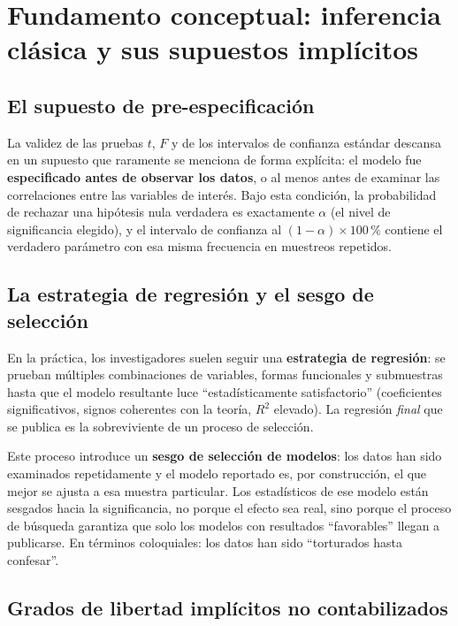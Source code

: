 \documentclass[12pt, letterpaper]{article}
\begin{document}
\section{Fundamento conceptual: inferencia clásica y sus supuestos implícitos}

\subsection{El supuesto de pre-especificación}

La validez de las pruebas $t$, $F$ y de los intervalos de confianza
estándar descansa en un supuesto que raramente se menciona de forma
explícita: el modelo fue \textbf{especificado antes de observar los datos},
o al menos antes de examinar las correlaciones entre las variables de
interés. Bajo esta condición, la probabilidad de rechazar una hipótesis
nula verdadera es exactamente $\alpha$ (el nivel de significancia elegido),
y el intervalo de confianza al $(1-\alpha)\times 100\,\%$ contiene el
verdadero parámetro con esa misma frecuencia en muestreos repetidos.

\subsection{La estrategia de regresión y el sesgo de selección}

En la práctica, los investigadores suelen seguir una \textbf{estrategia de
regresión}: se prueban múltiples combinaciones de variables, formas
funcionales y submuestras hasta que el modelo resultante luce
``estadísticamente satisfactorio'' (coeficientes significativos, signos
coherentes con la teoría, $R^2$ elevado). La regresión \emph{final} que
se publica es la sobreviviente de un proceso de selección.

Este proceso introduce un \textbf{sesgo de selección de modelos}: los
datos han sido examinados repetidamente y el modelo reportado es,
por construcción, el que mejor se ajusta a esa muestra particular.
Los estadísticos de ese modelo están sesgados hacia la significancia,
no porque el efecto sea real, sino porque el proceso de búsqueda garantiza
que solo los modelos con resultados ``favorables'' llegan a publicarse.
En términos coloquiales: los datos han sido ``torturados hasta confesar''.

\subsection{Grados de libertad implícitos no contabilizados}
\end{document}
